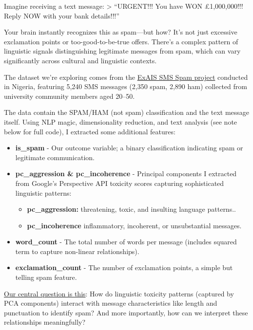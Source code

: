 \documentclass[
  letterpaper,
  DIV=11,
  numbers=noendperiod]{scrartcl}
\begin{document}
Imagine receiving a text message: \textgreater{} ``URGENT!!! You have
WON £1,000,000!!! Reply NOW with your bank details!!!''

Your brain instantly recognizes this as spam---but how? It's not just
excessive exclamation points or too-good-to-be-true offers. There's a
complex pattern of linguistic signals distinguishing legitimate messages
from spam, which can vary significantly across cultural and linguistic
contexts.

The dataset we're exploring comes from the
\href{https://www.kaggle.com/datasets/ysfbil/exais-sms-dataset}{ExAIS
SMS Spam project} conducted in Nigeria, featuring 5,240 SMS messages
(2,350 spam, 2,890 ham) collected from university community members aged
20--50.

The data contain the SPAM/HAM (not spam) classification and the text
message itself. Using NLP magic, dimensionality reduction, and text
analysis (see note below for full code), I extracted some additional
features:

\begin{itemize}
\item
  \textbf{is\_spam} - Our outcome variable; a binary classification
  indicating spam or legitimate communication.
\item
  \textbf{pc\_aggression \& pc\_incoherence} - Principal components I
  extracted from Google's Perspective API toxicity scores capturing
  sophisticated linguistic patterns:

  \begin{itemize}
  \item
    \textbf{pc\_aggression:} threatening, toxic, and insulting language
    patterns..
  \item
    \textbf{pc\_incoherence} inflammatory, incoherent, or unsubstantial
    messages.
  \end{itemize}
\item
  \textbf{word\_count} - The total number of words per message (includes
  squared term to capture non-linear relationships).
\item
  \textbf{exclamation\_count} - The number of exclamation points, a
  simple but telling spam feature.
\end{itemize}

\ul{Our central question is this}: How do linguistic toxicity patterns
(captured by PCA components) interact with message characteristics like
length and punctuation to identify spam? And more importantly, how can
we interpret these relationships meaningfully?
\end{document}
